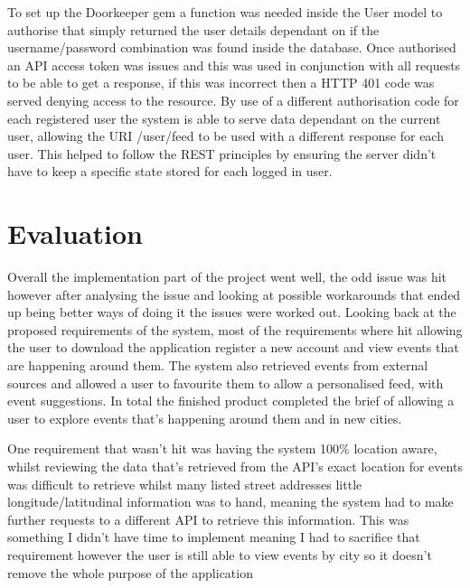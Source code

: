 		To set up the Doorkeeper gem a function was needed inside the User model to authorise that simply returned the user details dependant on if the username/password combination was found inside the database. Once authorised an API access token was issues and this was used in conjunction with all requests to be able to get a response, if this was incorrect then a HTTP 401 code was served denying access to the resource. By use of a different authorisation code for each registered user the system is able to serve data dependant on the current user, allowing the URI /user/feed to be used with a different response for each user. This helped to follow the REST principles by ensuring  the server didn't have to keep a specific state stored for each logged in user. 


	\section{Evaluation}
		Overall the implementation part of the project went well, the odd issue was hit however after analysing the issue and looking at possible workarounds that ended up being better ways of doing it the issues were worked out. Looking back at the proposed requirements of the system, most of the requirements where hit allowing the user to download the application register a new account and view events that are happening around them. The system also retrieved events from external sources and allowed a user to favourite them to allow a personalised feed, with event suggestions. In total the finished product completed the brief of allowing a user to explore events that's happening around them and in new cities.

		One requirement that wasn't hit was having the system 100\% location aware, whilst reviewing the data that's retrieved from the API's exact location for events was difficult to retrieve whilst many listed street addresses little longitude/latitudinal information was to hand, meaning the system had to make further requests to a different API to retrieve this information. This was something I didn't have time to implement meaning I had to sacrifice that requirement however the user is still able to view events by city so it doesn't remove the whole purpose of the application